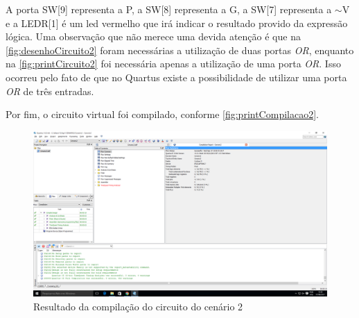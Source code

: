 	A porta SW[9] representa a P, a SW[8] representa a G, a SW[7]
	 representa a $\sim$V e a LEDR[1] é um led vermelho que irá
	 indicar o resultado provido da expressão lógica. Uma observação que não merece uma devida atenção é que
	 na \autoref{fig:desenhoCircuito2} foram necessárias a utilização de duas portas \textit{OR}, enquanto na
	 \autoref{fig:printCircuito2} foi necessária apenas a utilização de uma porta \textit{OR}. Isso ocorreu pelo fato
	 de que no Quartus existe a possibilidade de utilizar uma porta \textit{OR} de três entradas.

	Por fim, o circuito virtual foi compilado, conforme \autoref{fig:printCompilacao2}.

	\begin{figure}[H]
	    \centering
		\caption{\label{fig:printCompilacao2}Resultado da compilação do circuito do cenário 2}
		\includegraphics[width=1\textwidth]{img/cenario2/printCompilacao}
	\end{figure}


